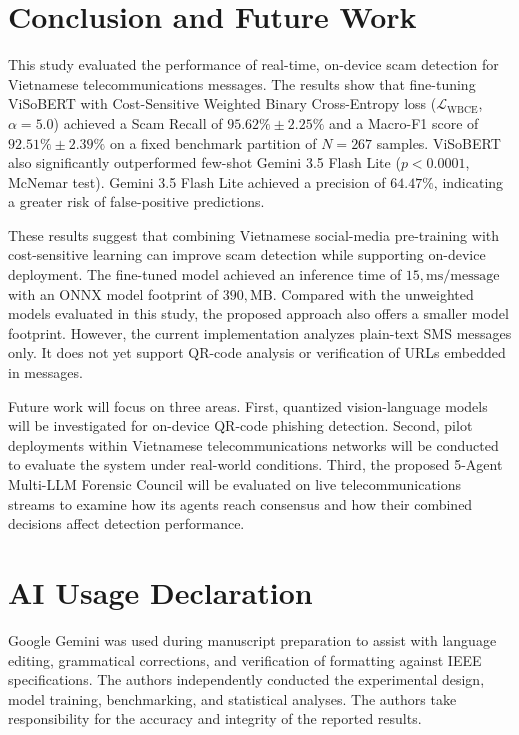 \section{Conclusion and Future Work}
\label{sec:conclusion}

This study evaluated the performance of real-time, on-device scam detection for Vietnamese telecommunications messages. The results show that fine-tuning ViSoBERT with Cost-Sensitive Weighted Binary Cross-Entropy loss ($\mathcal{L}_{\text{WBCE}}$, $\alpha = 5.0$) achieved a Scam Recall of $95.62\%\pm 2.25\%$ and a Macro-F1 score of $92.51\% \pm 2.39\%$ on a fixed benchmark partition of $N = 267$ samples. ViSoBERT also significantly outperformed few-shot Gemini 3.5 Flash Lite ($p < 0.0001$, McNemar test). Gemini 3.5 Flash Lite achieved a precision of $64.47\%$, indicating a greater risk of false-positive predictions.

These results suggest that combining Vietnamese social-media pre-training with cost-sensitive learning can improve scam detection while supporting on-device deployment. The fine-tuned model achieved an inference time of $15,\text{ms/message}$ with an ONNX model footprint of $390,\text{MB}$. Compared with the unweighted models evaluated in this study, the proposed approach also offers a smaller model footprint. However, the current implementation analyzes plain-text SMS messages only. It does not yet support QR-code analysis or verification of URLs embedded in messages.

Future work will focus on three areas. First, quantized vision-language models will be investigated for on-device QR-code phishing detection. Second, pilot deployments within Vietnamese telecommunications networks will be conducted to evaluate the system under real-world conditions. Third, the proposed 5-Agent Multi-LLM Forensic Council will be evaluated on live telecommunications streams to examine how its agents reach consensus and how their combined decisions affect detection performance.

\section*{AI Usage Declaration}

Google Gemini was used during manuscript preparation to assist with language editing, grammatical corrections, and verification of formatting against IEEE specifications. The authors independently conducted the experimental design, model training, benchmarking, and statistical analyses. The authors take responsibility for the accuracy and integrity of the reported results.
